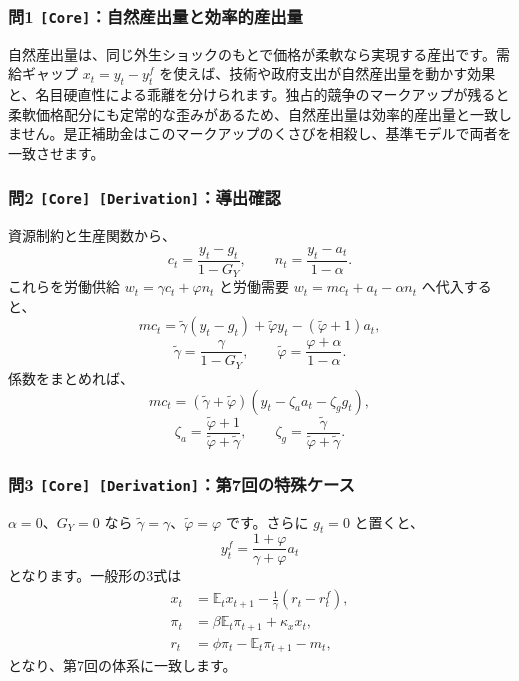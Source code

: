 \documentclass[
  japanese,
  lualatex,
  ja=standard,
  11pt,
  a4paper]{ltjsarticle}
\begin{document}
\subsubsection{\texorpdfstring{問1
\texttt{{[}Core{]}}：自然産出量と効率的産出量}{問1 {[}Core{]}：自然産出量と効率的産出量}}\label{ux554f1-coreux81eaux7136ux7523ux51faux91cfux3068ux52b9ux7387ux7684ux7523ux51faux91cf}

自然産出量は、同じ外生ショックのもとで価格が柔軟なら実現する産出です。需給ギャップ
\(x_t=y_t-y_t^f\)
を使えば、技術や政府支出が自然産出量を動かす効果と、名目硬直性による乖離を分けられます。独占的競争のマークアップが残ると柔軟価格配分にも定常的な歪みがあるため、自然産出量は効率的産出量と一致しません。是正補助金はこのマークアップのくさびを相殺し、基準モデルで両者を一致させます。

\subsubsection{\texorpdfstring{問2
\texttt{{[}Core{]}\ {[}Derivation{]}}：導出確認}{問2 {[}Core{]} {[}Derivation{]}：導出確認}}\label{ux554f2-core-derivationux5c0eux51faux78baux8a8d-1}

資源制約と生産関数から、 \[
c_t=\frac{y_t-g_t}{1-G_Y},
\qquad
n_t=\frac{y_t-a_t}{1-\alpha}.
\] これらを労働供給 \(w_t=\gamma c_t+\varphi n_t\) と労働需要
\(w_t=mc_t+a_t-\alpha n_t\) へ代入すると、 \[
mc_t
=\widetilde\gamma(y_t-g_t)
+\widetilde\varphi y_t-(\widetilde\varphi+1)a_t,
\] \[
\widetilde\gamma=\frac{\gamma}{1-G_Y},
\qquad
\widetilde\varphi=\frac{\varphi+\alpha}{1-\alpha}.
\] 係数をまとめれば、 \[
mc_t=(\widetilde\gamma+\widetilde\varphi)
(y_t-\zeta_aa_t-\zeta_gg_t),
\] \[
\zeta_a=\frac{\widetilde\varphi+1}{\widetilde\varphi+\widetilde\gamma},
\qquad
\zeta_g=\frac{\widetilde\gamma}{\widetilde\varphi+\widetilde\gamma}.
\]

\subsubsection{\texorpdfstring{問3
\texttt{{[}Core{]}\ {[}Derivation{]}}：第7回の特殊ケース}{問3 {[}Core{]} {[}Derivation{]}：第7回の特殊ケース}}\label{ux554f3-core-derivationux7b2c7ux56deux306eux7279ux6b8aux30b1ux30fcux30b9}

\(\alpha=0\)、\(G_Y=0\) なら
\(\widetilde\gamma=\gamma\)、\(\widetilde\varphi=\varphi\) です。さらに
\(g_t=0\) と置くと、 \[
y_t^f=\frac{1+\varphi}{\gamma+\varphi}a_t
\] となります。一般形の3式は \[
\begin{aligned}
x_t&=\mathbb E_tx_{t+1}-\frac1\gamma(r_t-r_t^f),\\
\pi_t&=\beta\mathbb E_t\pi_{t+1}+\kappa_xx_t,\\
r_t&=\phi\pi_t-\mathbb E_t\pi_{t+1}-m_t,
\end{aligned}
\] となり、第7回の体系に一致します。
\end{document}
